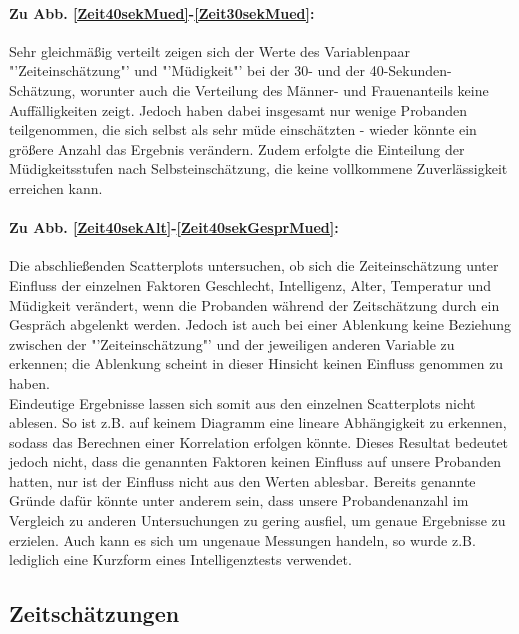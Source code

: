 \documentclass{Paper}
\begin{document}
\paragraph{Zu Abb. \ref{Zeit40sekMued}-\ref{Zeit30sekMued}:} Sehr gleichmäßig verteilt zeigen sich der Werte des Variablenpaar "'Zeiteinschätzung"' und "'Müdigkeit"' bei der 30- und der 40-Sekunden-Schätzung, worunter auch die Verteilung des Männer- und Frauenanteils keine Auffälligkeiten zeigt. Jedoch haben dabei insgesamt nur wenige Probanden teilgenommen, die sich selbst als sehr müde einschätzten - wieder könnte ein größere Anzahl das Ergebnis verändern. Zudem erfolgte die Einteilung der Müdigkeitsstufen nach Selbsteinschätzung, die keine vollkommene Zuverlässigkeit erreichen kann. 

\paragraph{Zu Abb. \ref{Zeit40sekAlt}-\ref{Zeit40sekGesprMued}:} Die abschließenden Scatterplots untersuchen, ob sich die Zeiteinschätzung unter Einfluss der einzelnen Faktoren Geschlecht, Intelligenz, Alter, Temperatur und Müdigkeit verändert, wenn die Probanden während der Zeitschätzung durch ein Gespräch abgelenkt werden. Jedoch ist auch bei einer Ablenkung keine Beziehung zwischen der "'Zeiteinschätzung"' und der jeweiligen anderen Variable zu erkennen; die Ablenkung scheint in dieser Hinsicht keinen Einfluss genommen zu haben.\\ 

Eindeutige Ergebnisse lassen sich somit aus den einzelnen Scatterplots nicht ablesen. So ist z.B. auf keinem Diagramm eine lineare Abhängigkeit zu erkennen, sodass das Berechnen einer Korrelation erfolgen könnte. Dieses Resultat bedeutet jedoch nicht, dass die genannten Faktoren keinen Einfluss auf unsere Probanden hatten, nur ist der Einfluss nicht aus den Werten ablesbar. Bereits genannte Gründe dafür könnte unter anderem sein, dass unsere Probandenanzahl im Vergleich zu anderen Untersuchungen zu gering ausfiel, um genaue Ergebnisse zu erzielen. Auch kann es sich um ungenaue Messungen handeln, so wurde z.B. lediglich eine Kurzform eines Intelligenztests verwendet.

\subsection{Zeitschätzungen}
\end{document}

